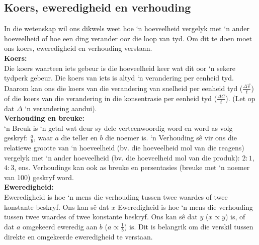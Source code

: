 \subsection*{Koers, eweredigheid en verhouding}
In die wetenskap wil ons dikwels weet hoe ‘n hoeveelheid vergelyk met ‘n ander hoeveelheid of hoe een ding verander oor die loop van tyd. Om dit te doen moet ons koers, eweredigheid en verhouding verstaan. \\
\textbf{Koers:}\\
Die koers waarteen iets gebeur is die hoeveelheid keer wat dit oor ‘n sekere tydperk gebeur. Die koers van iets is altyd ‘n verandering per eenheid tyd. Daarom kan ons die koers van die verandering van snelheid per eenheid tyd ($\frac{\Delta \vec{v}}{t}$) of die koers van die verandering in die konsentrasie per eenheid tyd ($\frac{\Delta{C}}{t}$). (Let op dat $\Delta$ ‘n verandering aandui). \\
\textbf{Verhouding en breuke:}\\
‘n Breuk is ‘n getal wat deur sy dele verteenwoordig word en word as volg geskryf: $\frac{a}{b}$, waar $a$ die teller en $b$ die noemer is. ‘n Verhouding sê vir ons die relatiewe grootte van ‘n hoeveelheid (bv. die hoeveelheid mol van die reagens) vergelyk met ‘n ander hoeveelheid (bv. die hoeveelheid mol van die produk): $2:1$, $4:3$, ens. Verhoudings kan ook as breuke en persentasies (breuke met ‘n noemer van 100) geskryf word.\\
\textbf{Eweredigheid:}\\
Eweredigheid is hoe ‘n mens die verhouding tussen twee waardes of twee konstante beskryf. Ons kan s\^{e} dat $x$ Eweredigheid is hoe ‘n mens die verhouding tussen twee waardes of twee konstante beskryf. Ons kan sê dat $y$ ($x \propto y$) is, of dat $a$ omgekeerd eweredig aan $b$ ($a \propto \frac{1}{b}$) is. Dit is belangrik om die verskil tussen direkte en omgekeerde eweredigheid te verstaan.
